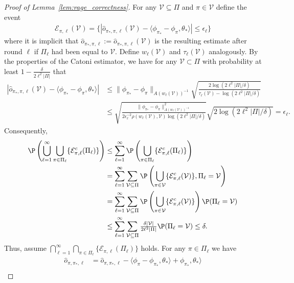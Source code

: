 \documentclass{article}
\newcommand{\mc}[1]{\mathcal{#1}}
\newcommand{\1}{\mathbf{1}}
\begin{document}
\begin{proof}[Proof of Lemma~\ref{lem:rage_correctness}]
For any $\mc{V} \subseteq \Pi$ and $\pi \in \mc{V}$ define the event
\begin{align*}
\mc{E}_{\pi,\ell}( \mc{V} ) = \{ |\hat{o}_{\pi_*,\pi,\ell}(\mc{V}) - \langle \phi_{\pi_*} - \phi_{\pi},\theta_* \rangle | \leq \epsilon_\ell \} 
\end{align*}
where it is implicit that $\hat{o}_{\pi_*,\pi,\ell}:=\hat{o}_{\pi_*,\pi,\ell}(\mc{V})$ is the resulting estimate after round $\ell$ if $\Pi_\ell$ had been equal to $\mc{V}$. 
Define $w_\ell(\mc{V})$ and $\tau_\ell(\mc{V})$ analogously.
By the properties of the Catoni estimator, we have for any $\mc{V} \subset \Pi$ with probability at least $1-\frac{\delta}{2 \ell^2 |\Pi|}$ that 
\begin{align*}
|\hat{o}_{\pi_*,\pi,\ell}(\mc{V}) - \langle \phi_{\pi_*} - \phi_{\pi},\theta_* \rangle |
&\leq \| \phi_{\pi_*} - \phi_{\pi} \|_{A(w_\ell(\mc{V}))^{-1}} \sqrt{ \frac{2 \log(2 \ell^2 |\Pi|/\delta )}{\tau_\ell(\mc{V}) - \log(2 \ell^2 |\Pi|/\delta )}} \\
&\leq \sqrt{ \frac{\| \phi_{\pi_*} - \phi_{\pi} \|^2_{A(w_\ell(\mc{V}))^{-1}}}{2 \epsilon_\ell^{-2} \rho(w_\ell(\mc{V}),\mc{V}) \log(2 \ell^2 |\Pi|/\delta)}} \sqrt{2 \log(2 \ell^2 |\Pi|/\delta)} = \epsilon_\ell.
\end{align*}
Consequently, 
\begin{align*}
\P\left( \bigcup_{\ell=1}^\infty \bigcup_{\pi \in \Pi_{\ell}} \{ \mc{E}^c_{\pi,\ell}( \Pi_\ell ) \} \right) &\leq \sum_{\ell=1}^\infty \P\left( \bigcup_{\pi \in \Pi_{\ell}} \{ \mc{E}^c_{\pi,\ell}( \Pi_{\ell} ) \} \right) \\
&= \sum_{\ell=1}^\infty \sum_{\mc{V} \subseteq \Pi} \P\left( \bigcup_{\pi \in \mc{V}} \{ \mc{E}^c_{\pi,\ell}( \mc{V} ) \} , \Pi_\ell = \mc{V}\right) \\
&= \sum_{\ell=1}^\infty \sum_{\mc{V} \subseteq \Pi} \P\left(\bigcup_{\pi \in \mc{V}} \{ \mc{E}^c_{\pi,\ell}( \mc{V} ) \} \right) \P( \Pi_\ell = \mc{V}) \\
&\leq \sum_{\ell=1}^\infty  \sum_{\mc{V} \subseteq \Pi} \tfrac{\delta |\mc{V}|}{2\ell^2 |\Pi|} \P( \Pi_\ell = \mc{V})  \leq \delta.
\end{align*}
Thus, assume $\bigcap_{\ell=1}^\infty \bigcap_{\pi \in \Pi_{\ell}} \{ \mc{E}_{\pi,\ell}( \Pi_\ell ) \} $ holds.
For any $\pi \in \Pi_\ell$ we have
\begin{align*}
\hat{o}_{\pi,\pi_*,\ell} &= \hat{o}_{\pi,\pi_*,\ell} - \langle \phi_{\pi} - \phi_{\pi_*},\theta_* \rangle + \phi_{\pi_*},\theta_* \rangle  \\

\end{align*}
\end{proof}
\end{document}
